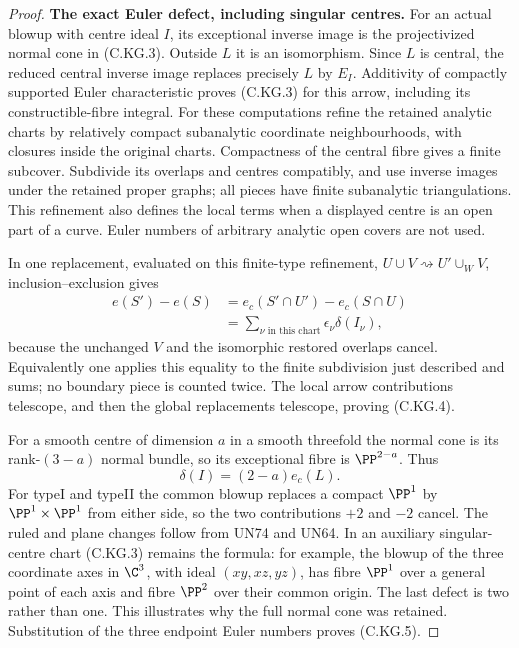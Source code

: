 \begin{proof}
\par\medskip\noindent\textbf{The exact Euler defect, including singular centres.}
For an actual blowup with centre ideal
$I$, its exceptional inverse image is
the projectivized normal cone in
(C.KG.3). Outside $L$ it is an
isomorphism. Since $L$ is central,
the reduced central inverse image
replaces precisely $L$ by $E_I$.
Additivity of compactly supported
Euler characteristic proves (C.KG.3)
for this arrow, including its
constructible-fibre integral.
For these computations refine the
retained analytic charts by relatively
compact subanalytic coordinate
neighbourhoods, with closures inside
the original charts. Compactness of
the central fibre gives a finite
subcover. Subdivide its overlaps and
centres compatibly, and use inverse
images under the retained proper
graphs; all pieces have finite
subanalytic triangulations. This
refinement also defines the local
terms when a displayed centre is an
open part of a curve. Euler numbers
of arbitrary analytic open covers
are not used.

In one replacement, evaluated on this
finite-type refinement,
$U\cup V\rightsquigarrow
U'\cup_WV$, inclusion--exclusion gives
\[
 \begin{split}
 e(S')-e(S)
   &=e_c(S'\cap U')-e_c(S\cap U)\\
   &=\sum_{\nu\text{ in this chart}}
                         \epsilon_\nu\delta(I_\nu),
 \end{split}
\tag{C.KG.9}
\]
because the unchanged $V$ and the
isomorphic restored overlaps cancel.
Equivalently one applies this equality
to the finite subdivision just
described and sums; no boundary
piece is counted twice. The local
arrow contributions telescope, and
then the global replacements
telescope, proving (C.KG.4).

For a smooth centre of dimension $a$
in a smooth threefold the normal
cone is its rank-$(3-a)$ normal
bundle, so its exceptional fibre
is $\PP^{2-a}$. Thus
\[
                \delta(I)=(2-a)e_c(L).
\tag{C.KG.10}
\]
For typeI and typeII the common
blowup replaces a compact $\PP^1$
by $\PP^1\times\PP^1$ from either
side, so the two contributions
$+2$ and $-2$ cancel. The ruled
and plane changes follow from
UN74 and UN64. In an auxiliary
singular-centre chart (C.KG.3)
remains the formula: for example,
the blowup of the three coordinate
axes in $\C^3$, with ideal
$(xy,xz,yz)$, has fibre $\PP^1$
over a general point of each axis
and fibre $\PP^2$ over their
common origin. The last defect
is two rather than one. This
illustrates why the full normal
cone was retained.
Substitution of the three endpoint
Euler numbers proves (C.KG.5).


\end{proof}
